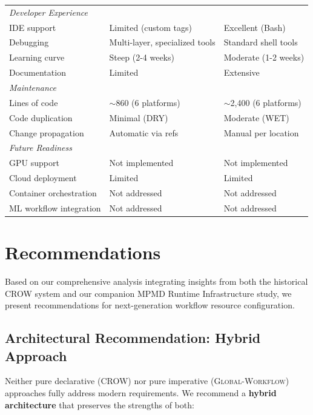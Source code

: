 \documentclass[11pt,twoside]{article}
\newcommand{\crow}{\textsc{CROW}}
\newcommand{\gw}{\textsc{Global-Workflow}}
\newcommand{\mpmd}{\textsc{MPMD}}
\begin{document}
\begin{table}[t]
\begin{tabular}{@{}p{4.5cm}p{5.5cm}p{5.5cm}@{}}
\midrule
\multicolumn{3}{l}{\textit{Developer Experience}} \\
IDE support & Limited (custom tags) & Excellent (Bash) \\
Debugging & Multi-layer, specialized tools & Standard shell tools \\
Learning curve & Steep (2-4 weeks) & Moderate (1-2 weeks) \\
Documentation & Limited & Extensive \\
\midrule
\multicolumn{3}{l}{\textit{Maintenance}} \\
Lines of code & $\sim$860 (6 platforms) & $\sim$2,400 (6 platforms) \\
Code duplication & Minimal (DRY) & Moderate (WET) \\
Change propagation & Automatic via refs & Manual per location \\
\midrule
\multicolumn{3}{l}{\textit{Future Readiness}} \\
GPU support & Not implemented & Not implemented \\
Cloud deployment & Limited & Limited \\
Container orchestration & Not addressed & Not addressed \\
ML workflow integration & Not addressed & Not addressed \\
\bottomrule
\end{tabular}
\end{table}

\clearpage

\section{Recommendations}
\label{sec:recommendations}

Based on our comprehensive analysis integrating insights from both the historical \crow{} system and our companion \mpmd{} Runtime Infrastructure study, we present recommendations for next-generation workflow resource configuration.

\subsection{Architectural Recommendation: Hybrid Approach}

Neither pure declarative (\crow{}) nor pure imperative (\gw{}) approaches fully address modern requirements. We recommend a \textbf{hybrid architecture} that preserves the strengths of both:
\end{document}
